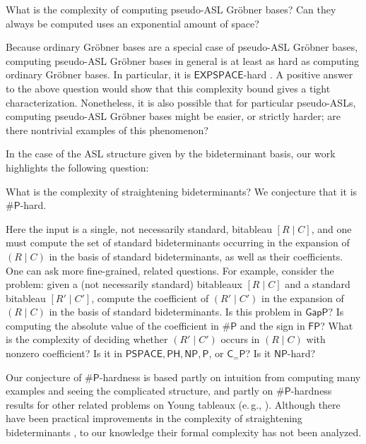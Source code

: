 \documentclass[11pt,reqno]{amsart}
\newcommand{\bitab}[2]{[#1\;|\;#2]}
\newcommand{\bidet}[2]{(#1\;|\;#2)}
\newcommand{\gb}{Gr\"{o}bner }
\theoremstyle{definition}
\numberwithin{equation}{section}
\begin{document}
\begin{open}
What is the complexity of computing pseudo-ASL Gröbner bases? Can they always be computed uses an exponential amount of space?
\end{open}

Because ordinary \gb bases are a special case of pseudo-ASL \gb bases, computing pseudo-ASL Gröbner bases in general is at least as hard as computing ordinary Gröbner bases. In particular, it is $\mathsf{EXPSPACE}$-hard \cite{MayrMeyer}. A positive answer to the above question would show that this complexity bound gives a tight characterization. Nonetheless, it is also possible that for particular pseudo-ASLs, computing pseudo-ASL Gröbner bases might be easier, or strictly harder; are there nontrivial examples of this phenomenon?

In the case of the ASL structure given by the bideterminant basis, our work highlights the following question:

\begin{open}
What is the complexity of straightening bideterminants? We conjecture that it is $\mathsf{\# P}$-hard.
\end{open}

Here the input is a single, not necessarily standard, bitableau $\bitab{R}{C}$, and one must compute the set of standard bideterminants occurring in the expansion of $\bidet{R}{C}$ in the basis of standard bideterminants, as well as their coefficients. One can ask more fine-grained, related questions. For example, consider the problem: given a (not necessarily standard) bitableaux $\bitab{R}{C}$ and a standard bitableau $\bitab{R'}{C'}$, compute the coefficient of $\bidet{R'}{C'}$ in the expansion of $\bidet{R}{C}$ in the basis of standard bideterminants. Is this problem in $\mathsf{GapP}$? Is computing the absolute value of the coefficient in $\mathsf{\# P}$ and the sign in $\mathsf{FP}$? What is the complexity of deciding whether $\bidet{R'}{C'}$ occurs in $\bidet{R}{C}$ with nonzero coefficient? Is it in $\mathsf{PSPACE}, \mathsf{PH}, \mathsf{NP}, \mathsf{P}$, or $\mathsf{C_{=} P}$? Is it $\mathsf{NP}$-hard?

Our conjecture of $\mathsf{\# P}$-hardness is based partly on intuition from computing many examples and seeing the complicated structure, and partly on $\mathsf{\# P}$-hardness results for other related problems on Young tableaux (e.\,g., \cite{narayanan, BIKronecker, FIplethysm, ARYSchubert}). Although there have been practical improvements in the complexity of straightening bideterminants \cite{desarmenien1980algorithm, ShaoLi}, to our knowledge their formal complexity has not been analyzed. 
\end{document}
